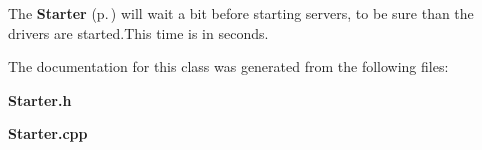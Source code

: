 The {\bf Starter} {\rm (p.\,\pageref{classStarter_1_1Starter})} will wait a bit before starting servers, to be sure than the drivers are started.This time is in seconds.



The documentation for this class was generated from the following files:\begin{CompactItemize}
\item 
{\bf Starter.h}\item 
{\bf Starter.cpp}\end{CompactItemize}
